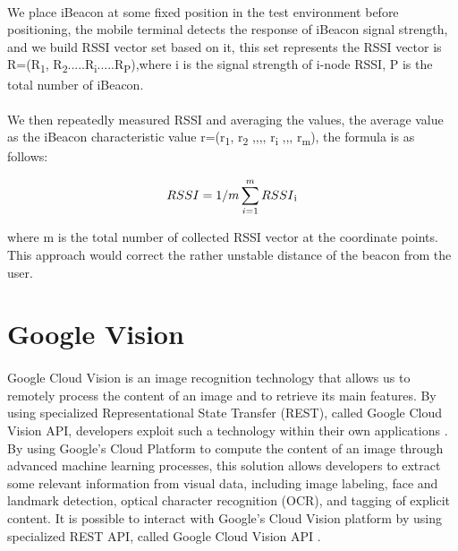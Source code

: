 \documentclass[12pt]{article}
\begin{document}
\paragraph{}We place iBeacon at some fixed position in the test environment before positioning, the mobile terminal detects the response of iBeacon signal strength, and we build RSSI vector set based on it, this set represents the RSSI vector is R=(R\textsubscript{1}, R\textsubscript{2}.....R\textsubscript{i}.....R\textsubscript{P}),where i is the signal strength of i-node RSSI, P is the total number of iBeacon. \cite{distanceTrack}

\paragraph{}We then repeatedly measured RSSI and averaging the values, the average value as the iBeacon characteristic value r=(r\textsubscript{1}, r\textsubscript{2} ,,,, r\textsubscript{i} ,,, r\textsubscript{m}), the formula is as follows:

\begin{equation}
RSSI = 1/m \sum_{i=1}^m RSSI \textsubscript{i}
\end{equation}

where m is the total number of collected RSSI vector at the coordinate points. This approach would correct the rather unstable distance of the beacon from the user. 

\section{Google Vision}
\label{vision}
\paragraph{}Google Cloud Vision is an image recognition technology that allows us to remotely process the content of an image and to retrieve its main features. By using specialized  Representational State Transfer (REST), called Google Cloud Vision API, developers exploit such a technology within their own applications \cite{vision}. By using Google’s Cloud Platform to compute the content of an image through advanced machine learning processes, this solution allows developers to extract some relevant information from visual data, including image labeling, face and landmark detection, optical character recognition (OCR), and tagging of explicit content. It is possible to interact with Google’s Cloud Vision platform by using specialized REST API, called Google Cloud Vision API \cite{vision}.
\end{document}
